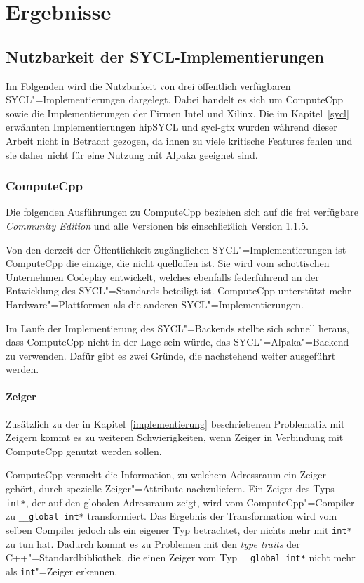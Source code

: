 \chapter{Ergebnisse}\label{ergebnisse}

\section{Nutzbarkeit der SYCL-Implementierungen}
\label{ergebnisse:nutzbarkeit}

Im Folgenden wird die Nutzbarkeit von drei öffentlich verfügbaren
SYCL"=Implementierungen dargelegt. Dabei handelt es sich um ComputeCpp sowie
die Implementierungen der Firmen Intel und Xilinx. Die im Kapitel~\ref{sycl}
erwähnten Implementierungen hipSYCL und sycl-gtx wurden während dieser Arbeit
nicht in Betracht gezogen, da ihnen zu viele kritische Features fehlen und sie
daher nicht für eine Nutzung mit Alpaka geeignet sind.

\subsection{ComputeCpp}

Die folgenden Ausführungen zu ComputeCpp beziehen sich auf die frei verfügbare
\textit{Community Edition} und alle Versionen bis einschließlich Version 1.1.5.

Von den derzeit der Öffentlichkeit zugänglichen SYCL"=Implementierungen ist
ComputeCpp die einzige, die nicht quelloffen ist. Sie wird vom schottischen
Unternehmen Codeplay entwickelt, welches ebenfalls federführend an der
Entwicklung des SYCL"=Standards beteiligt ist. ComputeCpp unterstützt mehr
Hardware"=Plattformen als die anderen SYCL"=Implementierungen.

Im Laufe der Implementierung des SYCL"=Backends stellte sich schnell heraus,
dass ComputeCpp nicht in der Lage sein würde, das SYCL"=Alpaka"=Backend zu
verwenden. Dafür gibt es zwei Gründe, die nachstehend weiter ausgeführt werden.

\subsubsection{Zeiger}

Zusätzlich zu der in Kapitel~\ref{implementierung} beschriebenen Problematik
mit Zeigern kommt es zu weiteren Schwierigkeiten, wenn Zeiger in Verbindung mit
ComputeCpp genutzt werden sollen.

ComputeCpp versucht die Information, zu welchem Adressraum ein Zeiger gehört,
durch spezielle Zeiger"=Attribute nachzuliefern. Ein Zeiger des Typs
\texttt{int*}, der auf den globalen Adressraum zeigt, wird vom
ComputeCpp"=Compiler zu \texttt{\_\_global int*} transformiert. Das Ergebnis der
Transformation wird vom selben Compiler jedoch als ein eigener Typ betrachtet,
der nichts mehr mit \texttt{int*} zu tun hat. Dadurch kommt es zu Problemen mit
den \textit{type traits} der C++"=Standardbibliothek, die einen Zeiger vom Typ
\texttt{\_\_global int*} nicht mehr als \texttt{int}"=Zeiger erkennen.

